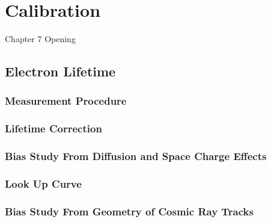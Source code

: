 
\chapter{Calibration}

\ifpdf
    \graphicspath{{Chapter7/Figs/Raster/}{Chapter7/Figs/PDF/}{Chapter7/Figs/}}
\else
    \graphicspath{{Chapter7/Figs/Vector/}{Chapter7/Figs/}}
\fi


Chapter 7 Opening

\newpage

\section{Electron Lifetime}

\subsection{Measurement Procedure}

\subsection{Lifetime Correction}

\subsection{Bias Study From Diffusion and Space Charge Effects}

\subsection{Look Up Curve}

\subsection{Bias Study From Geometry of Cosmic Ray Tracks}


